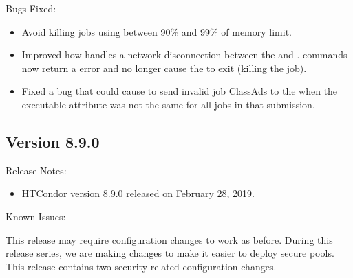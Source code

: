 \noindent Bugs Fixed:

\begin{itemize}

\item Avoid killing jobs using between 90\% and 99\% of memory limit. 

\item Improved how  handles a network disconnection between
the  and .
 commands now return a error and no longer cause the
 to exit (killing the job).

\item Fixed a bug that could cause  to send invalid job ClassAds to
the  when the executable attribute was not the same for all jobs in that
submission.

\end{itemize}

\subsection*{\label{sec:New-8-9-0}Version 8.9.0}

\noindent Release Notes:

\begin{itemize}

\item HTCondor version 8.9.0 released on February 28, 2019.

\end{itemize}

\noindent Known Issues:

This release may require configuration changes to work as before.
During this release series, we are making changes to make it easier to deploy
secure pools. This release contains two security related configuration changes.

